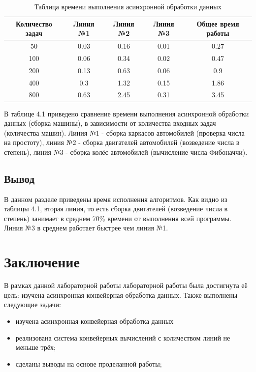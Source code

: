 \documentclass[12pt]{report}
\begin{document}
\begin{table} [h!]
	\caption{Таблица времени выполнения асинхронной обработки данных}
	\begin{center}
		\begin{tabular}{|c c c c c|} 
		 	\hline
			Количество задач & Линия №1 & Линия №2 & Линия №3 & Общее время работы  \\  
		 	\hline
		 	50 & 0.03 & 0.16 & 0.01 & 0.27 \\
		 	\hline
		 	100 & 0.06 & 0.34 & 0.02 & 0.47 \\
		 	\hline
		 	200 & 0.13 & 0.63 & 0.06 & 0.9 \\
		 	\hline
			400 & 0.3 & 1.32 & 0.15 & 1.86 \\
			\hline
			800 & 0.63  & 2.45 & 0.31 & 3.45 \\
			\hline
		\end{tabular}
	\end{center}
\end{table}

В таблице 4.1 приведено сравнение времени выполнения асинхронной обработки данных (сборка машины), в зависимости от количества входных задач (количества машин). Линия №1 - сборка каркасов автомобилей (проверка числа на простоту), линия №2 - сборка двигателей автомобилей (возведение числа в степень), линия №3 - сборка колёс автомобилей (вычисление числа Фибоначчи).

\section*{Вывод}

В данном разделе приведены время исполнения алгоритмов. Как видно из таблицы 4.1, вторая линия, то есть сборка двигателей (возведение числа в степень) занимает в среднем 70\% времени от выполнения всей программы. Линия №3 в среднем работает быстрее чем линия №1.

\chapter*{Заключение}

В рамках данной лабораторной работы лабораторной работы была достигнута её цель: изучена асинхронная конвейерная обработка данных. Также выполнены следующие задачи:

\begin{itemize}
	\item изучена асинхронная конвейерная обработка данных
	\item реализована система конвейерных вычислений с количеством линий не меньше трёх;
	\item сделаны выводы на основе проделанной работы;
\end{itemize}
\end{document}
